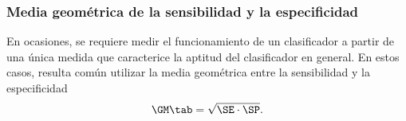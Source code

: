 %
\subsubsection{Media geométrica de la sensibilidad y  la especificidad}
%
En ocasiones, se requiere medir el funcionamiento de un clasificador a
partir de una única medida que caracterice la aptitud del clasificador
en general.
En estos casos, resulta común utilizar la media geométrica
entre la sensibilidad y la especificidad
%
\begin{align}
  \GM \tab = \sqrt{\SE\cdot\SP}.
\end{align}
%
